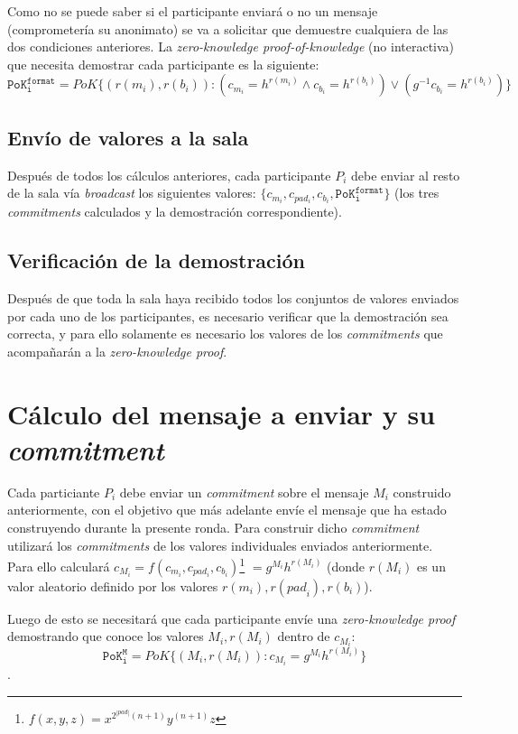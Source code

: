 Como no se puede saber si el participante enviará o no un mensaje 
(comprometería su anonimato) se va a solicitar que demuestre cualquiera de las 
dos condiciones anteriores. La \emph{zero-knowledge proof-of-knowledge} (no 
interactiva) que necesita demostrar cada participante es la siguiente: 
$$\mathtt{PoK_i^{format}} = PoK\{(r(m_i), r(b_i)) : (c_{m_i} = h^{r(m_i)} 
\land c_{b_i} = h^{r(b_i)}) \lor (g^{-1} c_{b_i} = h^{r(b_i)})\}$$

\subsection{Envío de valores a la sala}

Después de todos los cálculos anteriores, cada participante $P_i$ debe enviar 
al resto de la sala vía \emph{broadcast} los siguientes valores: 
$\{c_{m_i}, c_{pad_i}, c_{b_i}, \mathtt{PoK_i^{format}}\}$ (los tres 
\emph{commitments} calculados y la demostración correspondiente).

\subsection{Verificación de la demostración}

Después de que toda la sala haya recibido todos los conjuntos de valores 
enviados por cada uno de los participantes, es necesario verificar que la 
demostración sea correcta, y para ello solamente es necesario los valores de 
los \emph{commitments} que acompañarán a la \emph{zero-knowledge proof}.

\section{Cálculo del mensaje a enviar y su \emph{commitment}}

Cada particiante $P_i$ debe enviar un \emph{commitment} sobre el mensaje $M_i$ 
construido anteriormente, con el objetivo que más adelante envíe el mensaje 
que ha estado construyendo durante la presente ronda. Para construir dicho 
\emph{commitment} utilizará los \emph{commitments} de los valores individuales 
enviados anteriormente. 
Para ello calculará $c_{M_i} = f(c_{m_i}, c_{pad_i}, c_{b_i})$\footnote{
$f(x, y, z) = x^{2^{|pad|}(n+1)} y^{(n+1)} z$} 
$= g^{M_i} h^{r({M}_i)}$ (donde $r({M}_i)$ es un valor aleatorio definido por 
los valores $r(m_i), r({pad}_i), r(b_i)$). 

Luego de esto se necesitará que cada participante envíe una 
\emph{zero-knowledge proof} demostrando que conoce los valores 
$M_i, r(M_i)$ dentro de $c_{M_i}$:
$$\mathtt{PoK_i^M} = PoK\{(M_i, r(M_i)) : c_{M_i} = g^{M_i} h^{r(M_i)}\}$$.

